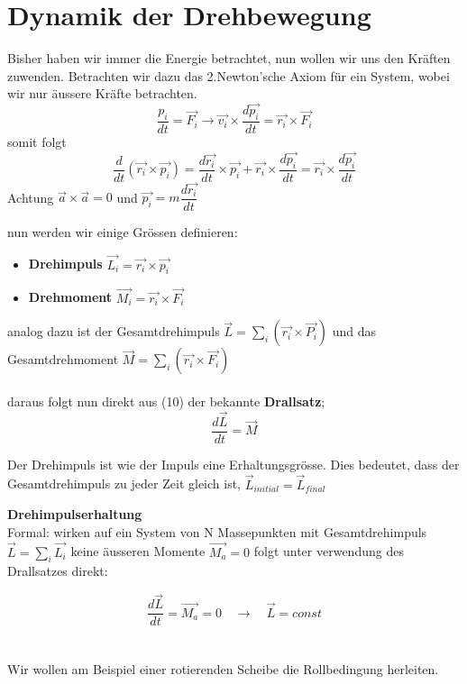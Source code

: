 \documentclass[12pt]{article}
\begin{document}
\section{Dynamik der Drehbewegung}
Bisher haben wir immer die Energie betrachtet, nun wollen wir uns den Kräften zuwenden. Betrachten wir dazu das 2.Newton'sche Axiom für ein System, wobei wir nur äussere Kräfte betrachten.
\begin{equation}
\dfrac{p_i}{dt} = \vec{F_i} \rightarrow \vec{v_i} \times \dfrac{d\vec{p_i}}{dt} = \vec{r_i} \times \vec{F_i}
\end{equation}
somit folgt
\begin{equation}
\dfrac{d}{dt} (\vec{r_i} \times \vec{p_i}) = \dfrac{d \vec{r_i}}{dt} \times \vec{p_i} + \vec{r_i} \times \dfrac{d \vec{p_i}}{dt} = \vec{r_i} \times \dfrac{d \vec{p_i}}{dt}
\end{equation}
Achtung $\vec{a} \times \vec{a} = 0$ und $\vec{p_i} = m \dfrac{d \vec{r_i}}{dt}$

nun werden wir einige Grössen definieren:

\begin{itemize}
\item \textbf{Drehimpuls} $\vec{L_i} = \vec{r_i} \times \vec{p_i}$
\item \textbf{Drehmoment} $\vec{M_i} = \vec{r_i} \times \vec{F_i}$
\end{itemize}
analog dazu ist der Gesamtdrehimpuls $\vec{L} = \sum_{i} (\vec{r_i} \times \vec{P_i})$ und das Gesamtdrehmoment $\vec{M} = \sum_{i} (\vec{r_i} \times \vec{F_i})$
\\
\\
daraus folgt nun direkt aus (10) der bekannte \textbf{Drallsatz};
\begin{equation}
\dfrac{d\vec{L}}{dt} = \vec{M}
\end{equation}


Der Drehimpuls ist wie der Impuls eine Erhaltungsgrösse. Dies bedeutet, dass der Gesamtdrehimpuls zu jeder Zeit gleich ist, $\vec{L}_{initial} =\vec{L}_{final}$
\\
\clearpage

\textbf{Drehimpulserhaltung}\\
Formal: wirken auf ein System von N Massepunkten mit Gesamtdrehimpuls $\vec{L} = \sum_{i} \vec{L_i}$ keine äusseren Momente $\vec{M_a} = 0$ folgt unter verwendung des Drallsatzes direkt:

\begin{equation}
\dfrac{d \vec{L}}{dt} = \vec{M_a} = 0 \quad \rightarrow \quad \vec{L} = const
\end{equation}
\\
\\
Wir wollen am Beispiel einer rotierenden Scheibe die Rollbedingung herleiten.
\end{document}
